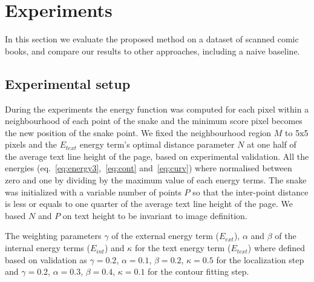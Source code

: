 \documentclass[conference]{IEEEtran}
\begin{document}
\section{Experiments}
\label{sec:experiments}
In this section we evaluate the proposed method on a dataset of scanned comic books, and compare our results to other approaches, including a naive baseline.


\subsection{Experimental setup}

During the experiments the energy function was computed for each pixel within a neighbourhood of each point of the snake and the minimum score pixel becomes the new position of the snake point. %
We fixed the neighbourhood region $M$ to 5x5 pixels and the $E_{text}$ energy term's optimal distance parameter $N$ at one half of the average text line height of the page, based on experimental validation.
All the energies (eq.~\ref{eq:energy3},~\ref{eq:cont} and~\ref{eq:curv}) where normalised between zero and one by dividing by the maximum value of each energy terms.
The snake was initialized with a variable number of points $P$ so that the inter-point distance is less or equals to one quarter of the average text line height of the page. 
We based $N$ and $P$ on text height to be invariant to image definition. 

The weighting parameters $\gamma$ of the external energy term ($E_{ext}$), $\alpha$ and $\beta$ of the internal energy terms ($E_{int}$) and $\kappa$ for the text energy term ($E_{text}$) where defined based on validation as $\gamma = 0.2$, $\alpha = 0.1$, $\beta = 0.2$, $\kappa = 0.5$ for the localization step and $\gamma = 0.2$, $\alpha = 0.3$, $\beta = 0.4$, $\kappa = 0.1$ for the contour fitting step.

\end{document}
